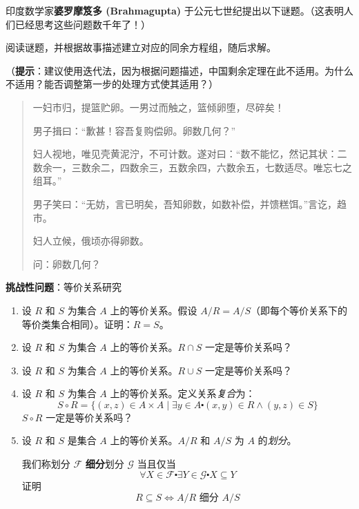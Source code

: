 \begin{exercise}
    \indent 印度数学家\textbf{婆罗摩笈多 (Brahmagupta)} 于公元七世纪提出以下谜题。（这表明人们已经思考这些问题数千年了！）

    阅读谜题，并根据故事描述建立对应的同余方程组，随后求解。

    （\textbf{提示}：建议使用迭代法，因为根据问题描述，中国剩余定理在此不适用。为什么不适用？能否调整第一步的处理方式使其适用？）

    \begin{quote}
        一妇市归，提篮贮卵。一男过而触之，篮倾卵堕，尽碎矣！

        男子揖曰：``歉甚！容吾复购偿卵。卵数几何？''

        妇人视地，唯见壳黄泥泞，不可计数。遂对曰：``数不能忆，然记其状：二数余一，三数余二，四数余三，五数余四，六数余五，七数适尽。唯忘七之组耳。''

        男子笑曰：``无妨，言已明矣，吾知卵数，如数补偿，并馈糕饵。''言讫，趋市。

        妇人立候，俄顷亦得卵数。

        问：卵数几何？
    \end{quote}
\end{exercise}

\clearpage

\begin{exercise}
    \textbf{挑战性问题}：等价关系研究
    \begin{enumerate}[label=(\alph*)]
        \item 设 $R$ 和 $S$ 为集合 $A$ 上的等价关系。假设 $A/R = A/S$（即每个等价关系下的等价类集合相同）。证明：$R = S$。
        \item 设 $R$ 和 $S$ 为集合 $A$ 上的等价关系。$R \cap S$ 一定是等价关系吗？
        \item 设 $R$ 和 $S$ 为集合 $A$ 上的等价关系。$R \cup S$ 一定是等价关系吗？
        \item 设 $R$ 和 $S$ 为集合 $A$ 上的等价关系。定义关系\emph{复合}为：
            \[S \circ R = \{(x, z) \in A \times A \mid \exists y \in A \centerdot (x, y) \in R \land (y, z) \in S\}\]
            $S \circ R$ 一定是等价关系吗？
        \item 设 $R$ 和 $S$ 是集合 $A$ 上的等价关系。$A/R$ 和 $A/S$ 为 $A$ 的\emph{划分}。
        
            我们称划分 $\mathcal{F}$ \textbf{细分}划分 $\mathcal{G}$ 当且仅当
            \[\forall X \in \mathcal{F} \centerdot \exists Y \in \mathcal{G} \centerdot X \subseteq Y\]
            证明
            \[R \subseteq S \iff A/R \text{\ 细分\ } A/S\]
    \end{enumerate}
\end{exercise}